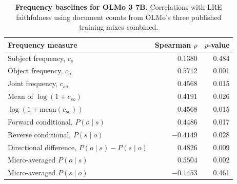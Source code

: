 \begin{table}[t]
\centering
\caption{\textbf{Frequency baselines for OLMo 3 7B.} Correlations with LRE faithfulness using document counts from OLMo's three published training mixes combined.}
\label{tab:shared-corpus-spearman}
\begin{tabular}{@{}lrr@{}}
\toprule
Frequency measure & Spearman $\rho$ & $p$-value \\
\midrule
Subject frequency, $c_s$ & $\phantom{-}0.1380$ & 0.484 \\
Object frequency, $c_o$ & $\phantom{-}0.5712$ & 0.001 \\
Joint frequency, $c_{so}$ & $\phantom{-}0.4568$ & 0.015 \\
Mean of $\log(1+c_{so})$ & $\phantom{-}0.4191$ & 0.026 \\
$\log(1+\mathrm{mean}(c_{so}))$ & $\phantom{-}0.4568$ & 0.015 \\
Forward conditional, $P(o\mid s)$ & $\phantom{-}0.4486$ & 0.017 \\
Reverse conditional, $P(s\mid o)$ & $-0.4149$ & 0.028 \\
Directional difference, $P(o\mid s)-P(s\mid o)$ & $\phantom{-}0.4826$ & 0.009 \\
Micro-averaged $P(o\mid s)$ & $\phantom{-}0.5504$ & 0.002 \\
Micro-averaged $P(s\mid o)$ & $-0.1453$ & 0.461 \\
\bottomrule
\end{tabular}
\end{table}
